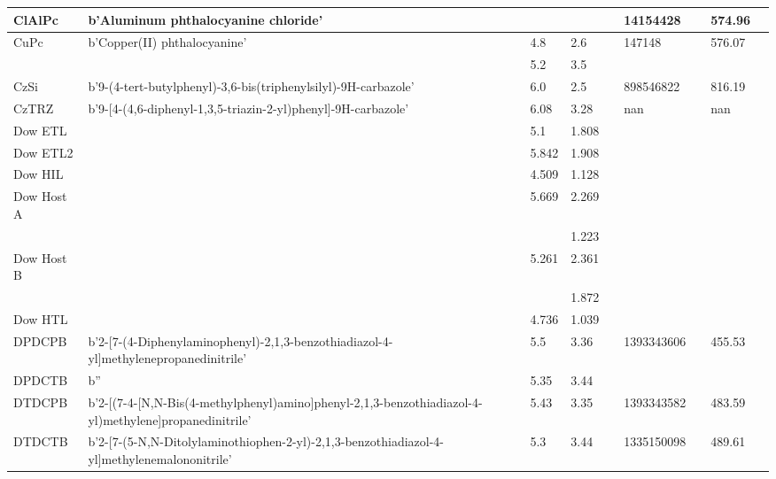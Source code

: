 \documentclass[../thesis.tex]{subfiles}
\begin{document}
\begin{landscape}
\begin{longtable}{| p{} | p{} | p{} | p{} | p{} | p{} | p{} | p{} | p{} | p{} | }
 \hline 
ClAlPc & b'Aluminum phthalocyanine chloride' &  &  &  &  & 14154428 &  & 574.96 &  \\ 
 
 \hline 
CuPc & b'Copper(II) phthalocyanine' &  & 4.8 & 2.6 &  & 147148 &  & 576.07 &  \\ 
 & &  & 5.2 & 3.5 &  &  & & & \\ 
 
 \hline 
CzSi & b'9-(4-tert-butylphenyl)-3,6-bis(triphenylsilyl)-9H-carbazole' &  & 6.0 & 2.5 &  & 898546822 &  & 816.19 &  \\ 
 
 \hline 
CzTRZ & b'9-[4-(4,6-diphenyl-1,3,5-triazin-2-yl)phenyl]-9H-carbazole' &  & 6.08 & 3.28 &  & nan &  & nan &  \\ 
 
 \hline 
Dow ETL &  &  & 5.1 & 1.808 &  &  &  &  &  \\ 
 
 \hline 
Dow ETL2 &  &  & 5.842 & 1.908 &  &  &  &  &  \\ 
 
 \hline 
Dow HIL &  &  & 4.509 & 1.128 &  &  &  &  &  \\ 
 
 \hline 
Dow Host A &  &  & 5.669 & 2.269 &  &  &  &  &  \\ 
 & &  &  & 1.223 &  &  & & & \\ 
 
 \hline 
Dow Host B &  &  & 5.261 & 2.361 &  &  &  &  &  \\ 
 & &  &  & 1.872 &  &  & & & \\ 
 
 \hline 
Dow HTL &  &  & 4.736 & 1.039 &  &  &  &  &  \\ 
 
 \hline 
DPDCPB & b'2-[7-(4-Diphenylaminophenyl)-2,1,3-benzothiadiazol-4-yl]methylenepropanedinitrile' &  & 5.5 & 3.36 &  & 1393343606 &  & 455.53 &  \\ 
 
 \hline 
DPDCTB & b'' &  & 5.35 & 3.44 &  &  &  &  &  \\ 
 
 \hline 
DTDCPB & b'2-[(7-{4-[N,N-Bis(4-methylphenyl)amino]phenyl}-2,1,3-benzothiadiazol-4-yl)methylene]propanedinitrile' &  & 5.43 & 3.35 &  & 1393343582 &  & 483.59 &  \\ 
 
 \hline 
DTDCTB & b'2-{[7-(5-N,N-Ditolylaminothiophen-2-yl)-2,1,3-benzothiadiazol-4-yl]methylene}malononitrile' &  & 5.3 & 3.44 &  & 1335150098 &  & 489.61 &  \\ 
 

\end{longtable}
\end{landscape}
\end{document}
